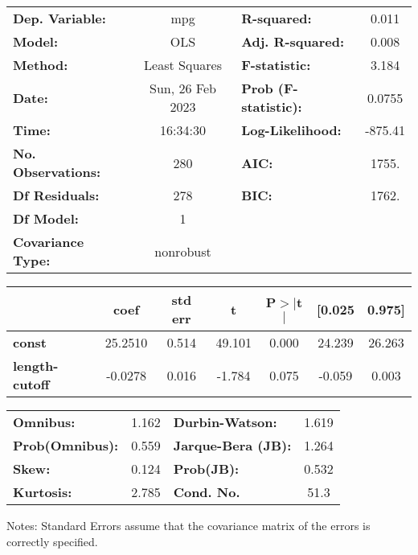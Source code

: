 \begin{center}
\begin{tabular}{lclc}
\toprule
\textbf{Dep. Variable:}    &       mpg        & \textbf{  R-squared:         } &     0.011   \\
\textbf{Model:}            &       OLS        & \textbf{  Adj. R-squared:    } &     0.008   \\
\textbf{Method:}           &  Least Squares   & \textbf{  F-statistic:       } &     3.184   \\
\textbf{Date:}             & Sun, 26 Feb 2023 & \textbf{  Prob (F-statistic):} &   0.0755    \\
\textbf{Time:}             &     16:34:30     & \textbf{  Log-Likelihood:    } &   -875.41   \\
\textbf{No. Observations:} &         280      & \textbf{  AIC:               } &     1755.   \\
\textbf{Df Residuals:}     &         278      & \textbf{  BIC:               } &     1762.   \\
\textbf{Df Model:}         &           1      & \textbf{                     } &             \\
\textbf{Covariance Type:}  &    nonrobust     & \textbf{                     } &             \\
\bottomrule
\end{tabular}
\begin{tabular}{lcccccc}
                       & \textbf{coef} & \textbf{std err} & \textbf{t} & \textbf{P$> |$t$|$} & \textbf{[0.025} & \textbf{0.975]}  \\
\midrule
\textbf{const}         &      25.2510  &        0.514     &    49.101  &         0.000        &       24.239    &       26.263     \\
\textbf{length-cutoff} &      -0.0278  &        0.016     &    -1.784  &         0.075        &       -0.059    &        0.003     \\
\bottomrule
\end{tabular}
\begin{tabular}{lclc}
\textbf{Omnibus:}       &  1.162 & \textbf{  Durbin-Watson:     } &    1.619  \\
\textbf{Prob(Omnibus):} &  0.559 & \textbf{  Jarque-Bera (JB):  } &    1.264  \\
\textbf{Skew:}          &  0.124 & \textbf{  Prob(JB):          } &    0.532  \\
\textbf{Kurtosis:}      &  2.785 & \textbf{  Cond. No.          } &     51.3  \\
\bottomrule
\end{tabular}
\end{center}

Notes: \newline
 [1] Standard Errors assume that the covariance matrix of the errors is correctly specified.